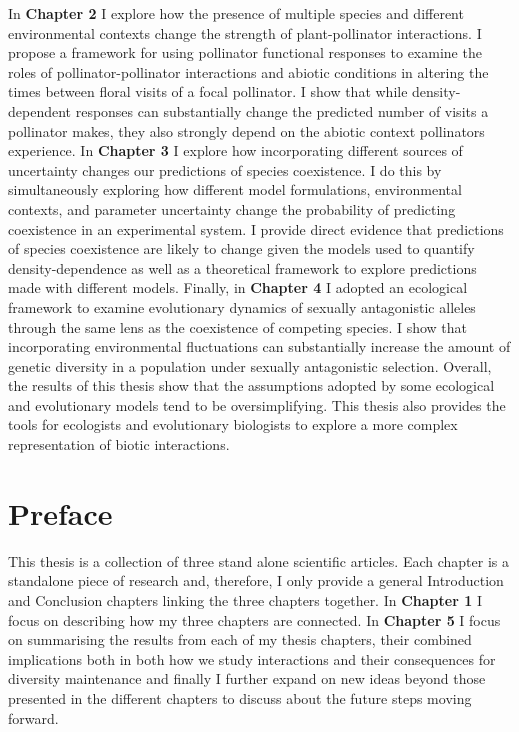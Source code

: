 \documentclass[12pt]{article}
\begin{document}
In \textbf{Chapter 2} I explore how the presence of multiple species and different environmental contexts change the strength of plant-pollinator interactions. I propose a framework for using pollinator functional responses to examine the roles of pollinator-pollinator interactions and abiotic conditions in altering the times between floral visits of a focal pollinator. I show that while density-dependent responses can substantially change the predicted number of visits a pollinator makes, they also strongly depend on the abiotic context pollinators experience. In \textbf{Chapter 3}  I explore how incorporating different sources of uncertainty changes our predictions of species coexistence. I do this by simultaneously exploring how different model formulations, environmental contexts, and parameter uncertainty change the probability of predicting coexistence in an experimental system. I provide direct evidence that predictions of species coexistence are likely to change given the models used to quantify density-dependence as well as a theoretical framework to explore predictions made with different models. Finally, in \textbf{Chapter 4}  I adopted an ecological framework to examine evolutionary dynamics of sexually antagonistic alleles through the same lens as the coexistence of competing species. I show that incorporating environmental fluctuations can substantially increase the amount of genetic diversity in a population under sexually antagonistic selection. Overall, the results of this thesis show that the assumptions adopted by some ecological and evolutionary models tend to be oversimplifying. This thesis also provides the tools for ecologists and evolutionary biologists to explore a more complex representation of biotic interactions.

\section*{Preface}

This thesis is a collection of three stand alone scientific articles. Each chapter is a standalone piece of research and, therefore, I only provide a general Introduction and Conclusion chapters linking the three chapters together. In  \textbf{Chapter 1} I focus on describing how my three chapters are connected. In  \textbf{Chapter 5} I focus on summarising the results from each of my thesis chapters, their combined implications both in both how we study interactions and their consequences for diversity maintenance and finally I further expand on new ideas beyond those presented in the different chapters to discuss about the future steps moving forward.
\end{document}
